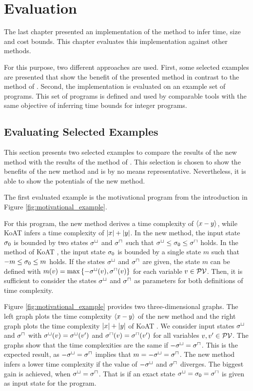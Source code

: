 \chapter{Evaluation}

The last chapter presented an implementation of the method to infer time, size and cost bounds.
This chapter evaluates this implementation against other methods.

For this purpose, two different approaches are used.
First, some selected examples are presented that show the benefit of the presented method in contrast to the method of \cite{koat}.
Second, the implementation is evaluated on an example set of programs.
This set of programs is defined and used by comparable tools with the same objective of inferring time bounds for integer programs.

\section{Evaluating Selected Examples}

This section presents two selected examples to compare the results of the new method with the results of the method of \cite{koat}.
This selection is chosen to show the benefits of the new method and is by no means representative.
Nevertheless, it is able to show the potentials of the new method.

The first evaluated example is the motivational program from the introduction in Figure \ref{fig:motivational_example}.



For this program, the new method derives a time complexity of $\left\langle x-y \right\rangle$, while KoAT \cite{koat} infers a time complexity of $\left|x\right|+\left|y\right|$.
In the new method, the input state $\sigma_0$ is bounded by two states ${\sigma^\sqcup}$ and ${\sigma^\sqcap}$ such that ${\sigma^\sqcup} \leq \sigma_0 \leq {\sigma^\sqcap}$ holds.
In the method of KoAT \cite{koat}, the input state $\sigma_0$ is bounded by a single state $m$ such that $-m \leq \sigma_0 \leq m$ holds.
If the states ${\sigma^\sqcup}$ and ${\sigma^\sqcap}$ are given, the state $m$ can be defined with $m(v) = \max \left\lbrace -{\sigma^\sqcup}(v),{\sigma^\sqcap}(v) \right\rbrace$ for each variable $v \in \mathcal{PV}$.
Then, it is sufficient to consider the states ${\sigma^\sqcup}$ and ${\sigma^\sqcap}$ as parameters for both definitions of time complexity.

Figure \ref{fig:motivational_example} provides two three-dimensional graphs.
The left graph plots the time complexity $\left\langle x-y \right\rangle$ of the new method and the right graph plots the time complexity $\left|x\right|+\left|y\right|$ of KoAT \cite{koat}.
We consider input states ${\sigma^\sqcup}$ and ${\sigma^\sqcap}$ with ${\sigma^\sqcup}(v) = {\sigma^\sqcup}(v')$ and ${\sigma^\sqcap}(v) = {\sigma^\sqcap}(v')$ for all variables $v, v' \in \mathcal{PV}$.
The graphs show that the time complexities are the same if $-{\sigma^\sqcup} = {\sigma^\sqcap}$.
This is the expected result, as $-{\sigma^\sqcup} = {\sigma^\sqcap}$ implies that $m = -{\sigma^\sqcup} = {\sigma^\sqcap}$.
The new method infers a lower time complexity if the value of $-{\sigma^\sqcup}$ and ${\sigma^\sqcap}$ diverges.
The biggest gain is achieved, when ${\sigma^\sqcup} = {\sigma^\sqcap}$.
That is if an exact state ${\sigma^\sqcup} = \sigma_0 = {\sigma^\sqcap}$ is given as input state for the program.

